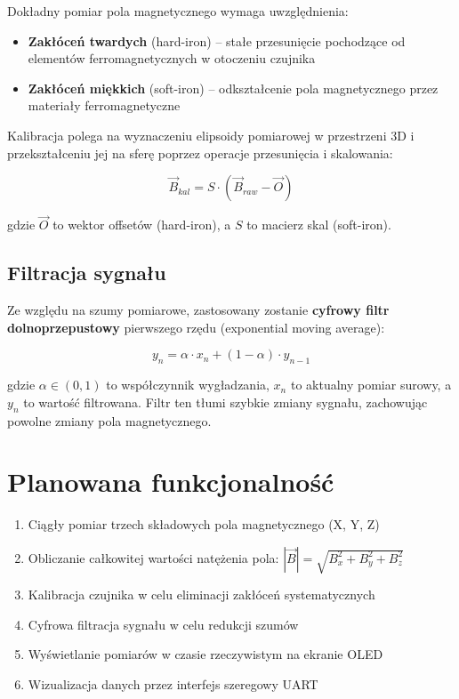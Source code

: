 \documentclass[12pt,a4paper]{article}
\begin{document}
Dokładny pomiar pola magnetycznego wymaga uwzględnienia:

\begin{itemize}
    \item \textbf{Zakłóceń twardych} (hard-iron) -- stałe przesunięcie pochodzące od elementów ferromagnetycznych w otoczeniu czujnika
    \item \textbf{Zakłóceń miękkich} (soft-iron) -- odkształcenie pola magnetycznego przez materiały ferromagnetyczne
\end{itemize}

Kalibracja polega na wyznaczeniu elipsoidy pomiarowej w przestrzeni 3D i przekształceniu jej na sferę poprzez operacje przesunięcia i skalowania:

\begin{equation}
\vec{B}_{kal} = S \cdot (\vec{B}_{raw} - \vec{O})
\end{equation}

gdzie $\vec{O}$ to wektor offsetów (hard-iron), a $S$ to macierz skal (soft-iron).

\subsection{Filtracja sygnału}

Ze względu na szumy pomiarowe, zastosowany zostanie \textbf{cyfrowy filtr dolnoprzepustowy} pierwszego rzędu (exponential moving average):

\begin{equation}
y_n = \alpha \cdot x_n + (1-\alpha) \cdot y_{n-1}
\end{equation}

gdzie $\alpha \in (0,1)$ to współczynnik wygładzania, $x_n$ to aktualny pomiar surowy, a $y_n$ to wartość filtrowana. Filtr ten tłumi szybkie zmiany sygnału, zachowując powolne zmiany pola magnetycznego.

\section{Planowana funkcjonalność}

\begin{enumerate}
    \item Ciągły pomiar trzech składowych pola magnetycznego (X, Y, Z)
    \item Obliczanie całkowitej wartości natężenia pola: $|\vec{B}| = \sqrt{B_x^2 + B_y^2 + B_z^2}$
    \item Kalibracja czujnika w celu eliminacji zakłóceń systematycznych
    \item Cyfrowa filtracja sygnału w celu redukcji szumów
    \item Wyświetlanie pomiarów w czasie rzeczywistym na ekranie OLED
    \item Wizualizacja danych przez interfejs szeregowy UART
\end{enumerate}
\end{document}
